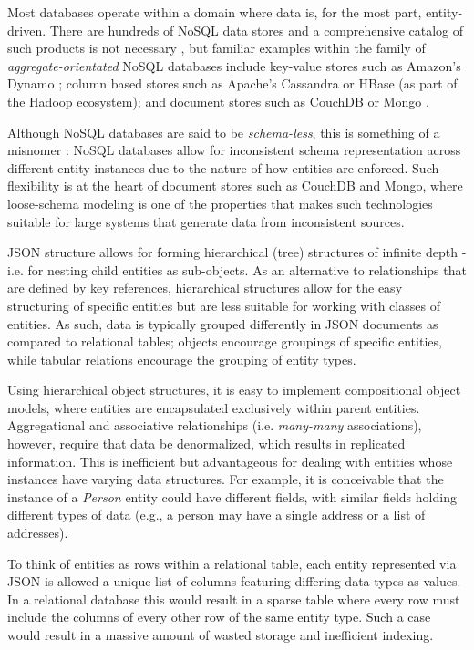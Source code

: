 Most databases operate within a domain where data is, for the most part, entity-driven. There are hundreds of NoSQL data stores and a comprehensive catalog of such products is not necessary \cite{GANESHCHANDRA201513}, but familiar examples within the family of \textit{aggregate-orientated} NoSQL databases include key-value stores such as Amazon's Dynamo \cite{sadalage2012}; column based stores such as Apache's Cassandra \cite{sadalage2012} or HBase \cite{sadalage2012} (as part of the Hadoop ecosystem); and document stores such as CouchDB or Mongo \cite{sadalage2012}.

Although NoSQL databases are said to be \textit{schema-less}, this is something of a misnomer \cite{ATZENI2016}: NoSQL databases allow for inconsistent schema representation across different entity instances due to the nature of how entities are enforced. Such flexibility is at the heart of document stores such as CouchDB and Mongo, where loose-schema modeling is one of the properties that makes such technologies suitable for large systems that generate data from inconsistent sources.

JSON structure allows for forming hierarchical (tree) structures of infinite depth - i.e. for nesting child entities as sub-objects. As an alternative to relationships that are defined by key references, hierarchical structures allow for the easy structuring of specific entities but are less suitable for working with classes of entities. As such, data is typically grouped differently in JSON documents as compared to relational tables; objects encourage groupings of specific entities, while tabular relations encourage the grouping of entity types.

Using hierarchical object structures, it is easy to implement compositional object models, where entities are encapsulated exclusively within parent entities. Aggregational and associative relationships (i.e. \textit{many-many} associations), however, require that data be denormalized, which results in replicated information. This is inefficient but advantageous for dealing with entities whose instances have varying data structures. For example, it is conceivable that the instance of a \textit{Person} entity could have different fields, with similar fields holding different types of data (e.g., a person may have a single address or a list of addresses).

To think of entities as rows within a relational table, each entity represented via JSON is allowed a unique list of columns featuring differing data types as values. In a relational database this would result in a sparse table where every row must include the columns of every other row of the same entity type. Such a case would result in a massive amount of wasted storage and inefficient indexing.

